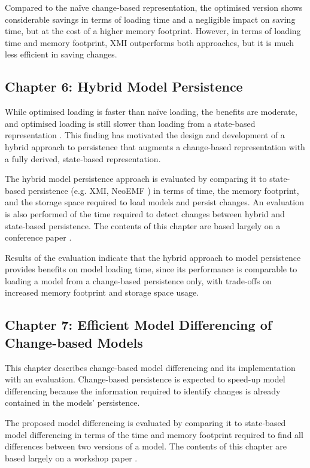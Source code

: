 Compared to the naïve change-based representation, the optimised version shows considerable savings in terms of loading time and a negligible impact on saving time, but at the cost of a higher memory footprint. However, in terms of loading time and memory footprint, XMI outperforms both approaches, but it is much less efficient in saving changes.

\subsection{Chapter 6: Hybrid Model Persistence}
\label{sec:chapter_5_hybrid_model_persistence}
While optimised loading is faster than naïve loading, the benefits are moderate, and optimised loading is still slower than loading from a state-based representation \cite{DBLP:conf/models/YohannisRPK18}. This finding has motivated the design and development of a hybrid approach to persistence that augments a change-based representation with a fully derived, state-based representation.

The hybrid model persistence approach is evaluated by comparing it to state-based persistence (e.g. XMI, NeoEMF \cite{daniel2016neoemf}) in terms of time, the memory footprint, and the storage space required to load models and persist changes. An evaluation is also performed of the time required to detect changes between hybrid and state-based persistence. The contents of this chapter are based largely on a conference paper \cite{DBLP:conf/models/YohannisRPK18}.

Results of the evaluation indicate that the hybrid approach to model persistence provides benefits on model loading time, since its performance is comparable to loading a model from a change-based persistence only, with trade-offs on increased memory footprint and storage space usage.

\subsection{Chapter 7: Efficient Model Differencing of Change-based Models}
\label{sec:chapter_6_model_differencing}
This chapter describes change-based model differencing and its implementation with an evaluation. Change-based persistence is expected to speed-up model differencing because the information required to identify changes is already contained in the models’ persistence.

The proposed model differencing is evaluated by comparing it to state-based model differencing in terms of the time and memory footprint required to find all differences between two versions of a model. The contents of this chapter are based largely on a workshop paper \cite{yohannis2019efficient}.

